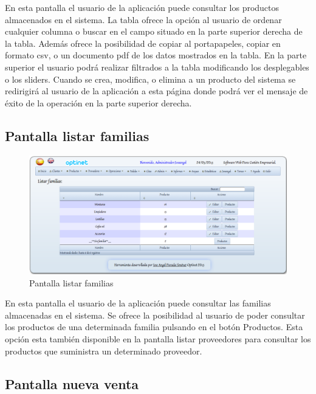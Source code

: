 \documentclass[a4paper,11pt]{book}
\begin{document}
En esta pantalla el usuario de la aplicación puede consultar los productos almacenados en el sistema. La tabla ofrece la opción al usuario de ordenar cualquier columna o buscar en el campo situado en la parte superior derecha de la tabla. Además ofrece la posibilidad de copiar al portapapeles, copiar en formato csv, o un documento pdf de los datos mostrados en la tabla. En la parte superior el usuario podrá realizar filtrados a la tabla modificando los desplegables o los sliders. Cuando se crea, modifica, o elimina a un producto del sistema se redirigirá al usuario de la aplicación a esta página donde podrá ver el mensaje de éxito de la operación en la parte superior derecha.

\newpage
\subsection {Pantalla listar familias}

\begin{figure}[!htb]
  \centering
    \includegraphics[scale=0.35]{caplistarfamilias.png}
  \caption{Pantalla listar familias}
  \label{a}
\end{figure}

En esta pantalla el usuario de la aplicación puede consultar las familias almacenadas en el sistema. Se ofrece la posibilidad al usuario de poder consultar los productos de una determinada familia pulsando en el botón Productos. Esta opción esta también disponible en la pantalla listar proveedores para consultar los productos que suministra un determinado proveedor.

\newpage
\subsection {Pantalla nueva venta}
\end{document}
